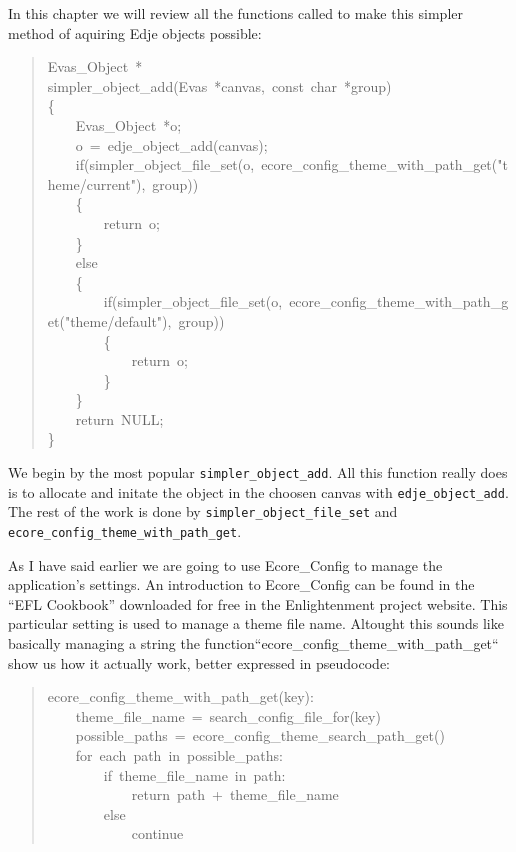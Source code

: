 \documentclass[12pt,a4paper,english]{book}
\begin{document}
In this chapter we will review all the functions called to make this simpler
method of aquiring Edje objects possible:
\begin{quote}{\ttfamily \raggedright \noindent
Evas{\_}Object~*~\\
simpler{\_}object{\_}add(Evas~*canvas,~const~char~*group)~\\
{\{}~\\
~~~~Evas{\_}Object~*o;~\\
~~~~o~=~edje{\_}object{\_}add(canvas);~\\
~~~~if(simpler{\_}object{\_}file{\_}set(o,~ecore{\_}config{\_}theme{\_}with{\_}path{\_}get("theme/current"),~group))~\\
~~~~{\{}~\\
~~~~~~~~return~o;~\\
~~~~{\}}~\\
~~~~else~\\
~~~~{\{}~\\
~~~~~~~~if(simpler{\_}object{\_}file{\_}set(o,~ecore{\_}config{\_}theme{\_}with{\_}path{\_}get("theme/default"),~group))~\\
~~~~~~~~{\{}~\\
~~~~~~~~~~~~return~o;~\\
~~~~~~~~{\}}~\\
~~~~{\}}~\\
~~~~return~NULL;~\\
{\}}
}\end{quote}

We begin by the most popular \texttt{simpler{\_}object{\_}add}. All this function really
does is to allocate and initate the object in the choosen canvas with
\texttt{edje{\_}object{\_}add}. The rest of the work is done by \texttt{simpler{\_}object{\_}file{\_}set}
and \texttt{ecore{\_}config{\_}theme{\_}with{\_}path{\_}get}.

As I have said earlier we are going to use Ecore{\_}Config to manage the
application's settings. An introduction to Ecore{\_}Config can be found in the
``EFL Cookbook'' downloaded for free in the Enlightenment project website. This
particular setting is used to manage a theme file name. Altought this sounds
like basically managing a string the function``ecore{\_}config{\_}theme{\_}with{\_}path{\_}get``
show us how it actually work, better expressed in pseudocode:
\begin{quote}{\ttfamily \raggedright \noindent
ecore{\_}config{\_}theme{\_}with{\_}path{\_}get(key):~\\
~~~~theme{\_}file{\_}name~=~search{\_}config{\_}file{\_}for(key)~\\
~~~~possible{\_}paths~=~ecore{\_}config{\_}theme{\_}search{\_}path{\_}get()~\\
~~~~for~each~path~in~possible{\_}paths:~\\
~~~~~~~~if~theme{\_}file{\_}name~in~path:~\\
~~~~~~~~~~~~return~path~+~theme{\_}file{\_}name~\\
~~~~~~~~else~\\
~~~~~~~~~~~~continue
}\end{quote}
\end{document}
